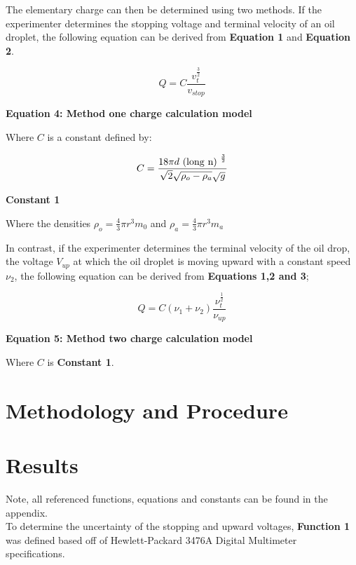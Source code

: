 \documentclass[
	letterpaper, %
	10pt, %
]{CSUniSchoolLabReport}
\begin{document}
The elementary charge can then be determined using two methods. If the experimenter determines the
stopping voltage and terminal velocity of an oil droplet, the following equation can be derived from
\textbf{Equation 1} and \textbf{Equation 2}.

$$Q = C \frac{v_t^{\frac{3}{2}}}{v_{stop}}$$
\begin{center}
    \textbf{Equation 4: Method one charge calculation model}
\end{center}

Where $C$ is a constant defined by:

$$C = \frac{18\pi d {\ \rm (long\ n)\ }^\frac{3}{2}}{\sqrt2 \sqrt{\rho_o-\rho_a}\sqrt g}$$
\begin{center}
    \textbf{Constant 1}
\end{center}

Where the densities $\rho_o = \frac{4}{3}\pi r^3m_0$ and $\rho_a = \frac{4}{3}\pi r^3 m_a$

In contrast, if the experimenter determines the terminal velocity of the oil drop, the voltage
$V_{up}$ at which the oil droplet is moving upward with a constant speed $\nu_2$, the following
equation can be derived from \textbf{Equations 1,2 and 3};

$$Q = C(\nu_1 + \nu_2)\frac{\nu_t^\frac{1}{2}}{\nu_{up}}$$
\begin{center}
    \textbf{Equation 5: Method two charge calculation model}
\end{center}
Where $C$ is \textbf{Constant 1}.

\section{Methodology and Procedure}

\section{Results}
Note, all referenced functions, equations and constants can be found in the appendix.\\

To determine the uncertainty of the stopping and upward voltages, \textbf{Function 1}
was defined based off of Hewlett-Packard 3476A Digital Multimeter specifications.\\
\end{document}
